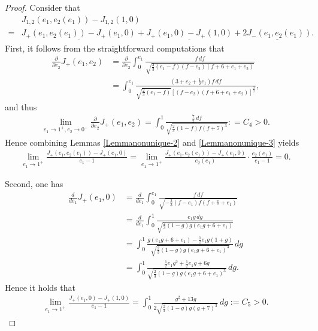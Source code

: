 \documentclass[reqno,12pt]{amsart}
\begin{document}
\begin{proof}
Consider that 
    \begin{align}
    &J_{1, 2}(e_1, e_2(e_1)) -J_{1, 2}(1, 0) \nonumber \\
    = & \underline{J_{+}(e_1, e_2(e_1)) - J_{+}(e_1, 0) }+ \underline{ J_{+}(e_1, 0)- J_{+}(1, 0) }+ \underline{ 2J_{-}(e_1, e_2(e_1))}. \label{nonunique-15}
    \end{align}
First, it follows from the straightforward computations that
\begin{align*}
    \frac{\partial}{\partial e_2} J_{+}(e_1, e_2) &=
    \frac{\partial}{\partial e_2}\int_0^{e_1} \frac{f\, df}{\sqrt{\frac23(e_1 -f) (f-e_2)(f+ 6 + e_1 + e_2)}}\\
    &= \int_0^{e_1} \frac{ (3+ e_2 +\frac12 e_1) f \, df  }{\sqrt{\frac23 (e_1 -f)} \left[ (f-e_2) (f+ 6 + e_1 +e_2)\right]^{\frac32}},
\end{align*}
and thus
\begin{align*}
    \lim_{e_1 \to 1^+, e_2\to 0^-} \frac{\partial}{\partial e_2} J_{+} (e_1, e_2) =\int_0^1 \frac{\frac72  \, df }{\sqrt{\frac23 (1-f) f (f+7)^3 }}  : =C_4>0. 
\end{align*}
Hence combining Lemmas \ref{Lemmanonunique-2} and \ref{Lemmanonunique-3} yields
\begin{align}\label{nonunique-16}
    \lim_{e_1\to 1^+} \frac{J_{+}(e_1, e_2(e_1)) - J_{+}(e_1, 0)}{e_1 -1}=  \lim_{e_1\to 1^+}\frac{J_{+}(e_1, e_2(e_1)) - J_{+}(e_1, 0)}{e_2(e_1)} \cdot \frac{e_2(e_1)}{e_1-1}  =0.
\end{align}

Second, one has
\begin{equation}\label{eq:deriofJ+}
\begin{aligned}
    \frac{d}{de_1}J_{+}(e_1, 0) &= \frac{d}{de_1}\int_0^{e_1} 
    \frac{f\, df }{\sqrt{-\frac23 (f-e_1) f (f+ 6+ e_1)}}\\
    &= \frac{d}{de_1}\int_0^1 \frac{e_1 g \, dg}{\sqrt{\frac23 (1-g) g (e_1 g + 6 + e_1)}}\\
    &= \int_0^1 \frac{g(e_1 g + 6+ e_1) -\frac12 e_1 g (1+g)}{\sqrt{\frac23 (1-g) g (e_1 g +6 +e_1)^3}}\, dg \\
    & = \int_0^1 \frac{\frac12 e_1 g^2 + \frac12 e_1 g + 6g}{\sqrt{\frac23 (1-g) g (e_1 g + 6+ e_1)^3}} \, dg.   
\end{aligned}
\end{equation}
Hence it holds that
\begin{align}\label{nonunique-17}
    \lim_{e_1 \to 1^+} \frac{J_{+}(e_1, 0) - J_{+}(1, 0) }{e_1 -1} =  \int_0^1 \frac{ g^2 + 13 g }{2\sqrt{\frac23 (1-g)g (g+7)^3}} \, dg := C_5>0. 
\end{align}


\end{proof}
\end{document}
